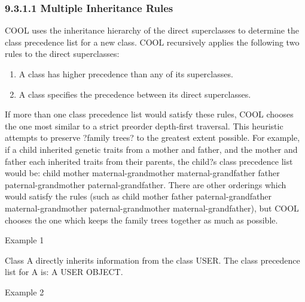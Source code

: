 \documentclass[letterpaper,10pt,english]{sphinxmanual}
\begin{document}
\subsubsection{9.3.1.1 Multiple Inheritance Rules}
\label{\detokenize{cool:multiple-inheritance-rules}}
COOL uses the inheritance hierarchy of the direct superclasses to
determine the class precedence list for a new class. COOL recursively
applies the following two rules to the direct superclasses:
\begin{enumerate}
\def\theenumi{\arabic{enumi}}
\def\labelenumi{\theenumi .}
\makeatletter\def\p@enumii{\p@enumi \theenumi .}\makeatother
\item {} 
A class has higher precedence than any of its superclasses.

\item {} 
A class specifies the precedence between its direct superclasses.

\end{enumerate}

If more than one class precedence list would satisfy these rules, COOL
chooses the one most similar to a strict preorder depth-first traversal.
This heuristic attempts to preserve ?family trees? to the greatest
extent possible. For example, if a child inherited genetic traits from a
mother and father, and the mother and father each inherited traits from
their parents, the child?s class precedence list would be: child mother
maternal-grandmother maternal-grandfather father paternal-grandmother
paternal-grandfather. There are other orderings which would satisfy the
rules (such as child mother father paternal-grandfather
maternal-grandmother paternal-grandmother maternal-grandfather), but
COOL chooses the one which keeps the family trees together as much as
possible.

Example 1

\begin{sphinxVerbatim}[commandchars=\\\{\}]
   
\end{sphinxVerbatim}

Class A directly inherits information from the class USER. The class
precedence list for A is: A USER OBJECT.

Example 2

\begin{sphinxVerbatim}[commandchars=\\\{\}]
   
\end{sphinxVerbatim}
\end{document}
